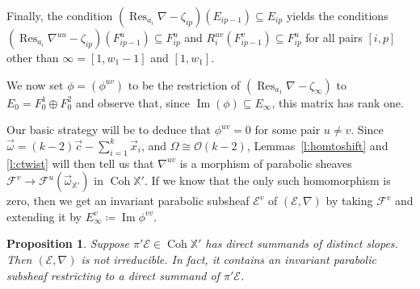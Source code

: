 \documentclass[12pt,a4paper]{amsart}
\theoremstyle{plain}
\newtheorem{prop}[thm]{Proposition}
\DeclareMathOperator{\Coh}{Coh}
\DeclareMathOperator{\Ima}{Im}
\DeclareMathOperator{\Res}{Res}
\newcommand{\OO}{\mathcal O}
\newcommand{\F}{\mathcal F}
\newcommand{\E}{\mathcal E}
\newcommand{\XX}{\mathbb X}
\newcommand{\ox}{\vec x}
\newcommand{\oc}{\vec c}
\newcommand{\oom}{\vec{\omega}}
\begin{document}
Finally, the condition $(\Res_{a_i}\nabla-\zeta_{ip})(E_{ip-1})\subseteq E_{ip}$ yields the conditions $(\Res_{a_i}\nabla^{uu}-\zeta_{ip})(F^u_{ip-1})\subseteq F^u_{ip}$ and $R_i^{uv}(F^v_{ip-1})\subseteq F_{ip}^u$ for all pairs $[i,p]$ other than $\infty=[1,w_1-1]$ and $[1,w_1]$.

We now set $\phi=(\phi^{uv})$ to be the restriction of $(\Res_{a_1}\nabla-\zeta_\infty)$ to $E_0=F^1_0\oplus F^2_0$ and observe that, since $\Ima(\phi)\subseteq E_\infty$, this matrix has rank one.

Our basic strategy will be to deduce that $\phi^{uv}=0$ for some pair $u\neq v$. Since $\oom = (k-2)\oc - \sum_{i=1}^k \ox_i$, and $\Omega\cong\OO(k-2)$, Lemmas~\ref{l:homtoshift} and \ref{l:ctwist} will then tell us that $\nabla^{uv}$ is a morphism of parabolic sheaves $\F^v\to\F^u(\oom_{\XX'})$ in $\Coh\XX'$. If we know that the only such homomorphism is zero, then we get an invariant parabolic subsheaf $\E^v$ of $(\E,\nabla)$ by taking $\F^v$ and extending it by $E^v_\infty\coloneqq\Ima\phi^{vv}$.

\begin{prop}
\label{p:exttubular1}
Suppose $\pi'\E\in\Coh\XX'$ has direct summands of distinct slopes. Then $(\E,\nabla)$ is not irreducible. In fact, it contains an invariant parabolic subsheaf restricting to a direct summand of $\pi'\E$.
\end{prop}
\end{document}
